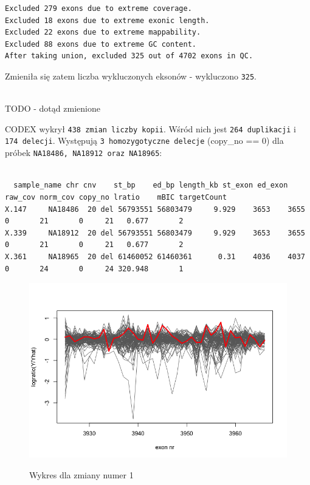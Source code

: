 \documentclass[a4paper]{article}
\begin{document}
\begin{verbatim}
Excluded 279 exons due to extreme coverage.
Excluded 18 exons due to extreme exonic length.
Excluded 22 exons due to extreme mappability.
Excluded 88 exons due to extreme GC content.
After taking union, excluded 325 out of 4702 exons in QC.
\end{verbatim}
Zmieniła się zatem liczba wykluczonych eksonów - wykluczono \texttt{325}.

\\ TODO - dotąd zmienione

CODEX wykrył \texttt{438 zmian liczby kopii}. Wśród nich jest \texttt{264 duplikacji} i \texttt{174 delecji}.
Występują \texttt{3 homozygotyczne delecje} (copy\_no == 0) dla próbek \texttt{NA18486, NA18912 oraz NA18965}:
\footnotesize
\begin{verbatim}

  sample_name chr cnv    st_bp    ed_bp length_kb st_exon ed_exon raw_cov norm_cov copy_no lratio    mBIC targetCount
X.147     NA18486  20 del 56793551 56803479     9.929    3653    3655       0       21       0     21   0.677       2
X.339     NA18912  20 del 56793551 56803479     9.929    3653    3655       0       21       0     21   0.677       2
X.361     NA18965  20 del 61460052 61460361      0.31    4036    4037       0       24       0     24 320.948       1
\end{verbatim}

\begin{figure}[h]
    \centering
    \includegraphics[width=1.0\textwidth]{plot_change_no_1.png}
    \label{fig:igv}
    \caption[]{Wykres dla zmiany numer 1}
\end{figure}
\end{document}
